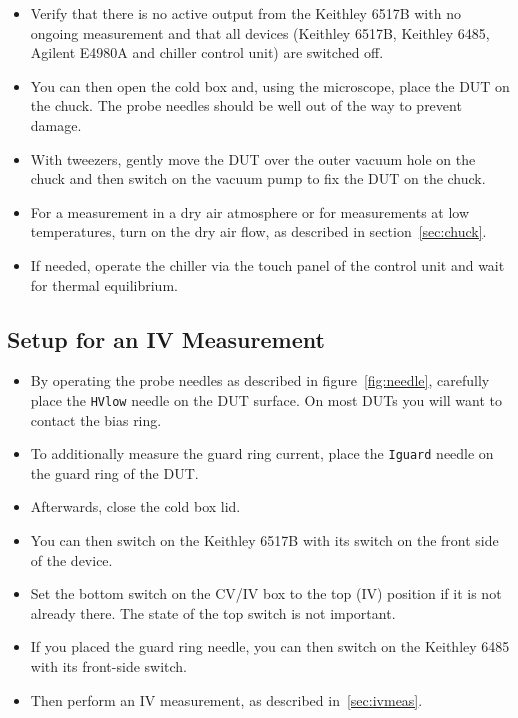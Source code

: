 \documentclass[a4paper]{article}
\begin{document}
\begin{itemize}
\item Verify that there is no active output from the Keithley 6517B with no ongoing measurement and that all devices (Keithley 6517B, Keithley 6485, Agilent E4980A and chiller control unit) are switched off.
\item You can then open the cold box and, using the microscope, place the DUT on the chuck.
The probe needles should be well out of the way to prevent damage.
\item With tweezers, gently move the DUT over the outer vacuum hole on the chuck and then switch on the vacuum pump to fix the DUT on the chuck.
\item For a measurement in a dry air atmosphere or for measurements at low temperatures, turn on the dry air flow, as described in section~\ref{sec:chuck}.
\item If needed, operate the chiller via the touch panel of the control unit and wait for thermal equilibrium.\\
\end{itemize}

\subsection{Setup for an IV Measurement}
\label{sec:ivsetup}

\begin{itemize}
\item By operating the probe needles as described in figure~\ref{fig:needle}, carefully place the {\tt HVlow} needle on the DUT surface.
On most DUTs you will want to contact the bias ring.
\item To additionally measure the guard ring current, place the {\tt Iguard} needle on the guard ring of the DUT.
\item Afterwards, close the cold box lid.
\item You can then switch on the Keithley 6517B with its switch on the front side of the device.
\item Set the bottom switch on the CV/IV box to the top (IV) position if it is not already there.
The state of the top switch is not important.
\item If you placed the guard ring needle, you can then switch on the Keithley 6485 with its front-side switch.
\item Then perform an IV measurement, as described in~\ref{sec:ivmeas}.\\
\end{itemize}
\end{document}
